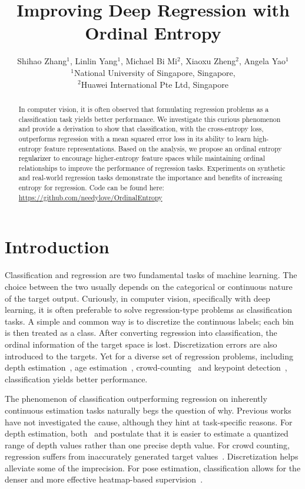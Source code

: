 \documentclass{article} %
\title{Improving Deep Regression with Ordinal Entropy}
\author{Shihao Zhang$^1$, Linlin Yang$^1$, Michael Bi Mi$^2$, Xiaoxu Zheng$^2$, Angela Yao$^1$ \\
$^1$National University of Singapore, Singapore, \\ 
$^2$Huawei International Pte Ltd, Singapore
}
\def\shihao{\textcolor{black}}
\begin{document}
\maketitle

\begin{abstract}
In computer vision, it is often observed that formulating regression problems as a classification task yields better performance.  
We investigate this curious phenomenon and provide a derivation to show that classification, with the cross-entropy loss, outperforms 
regression with a mean squared error loss in its ability to learn high-entropy feature representations.
Based on the analysis, we propose an ordinal entropy \shihao{regularizer} to encourage higher-entropy feature spaces while maintaining ordinal relationships to improve the performance of regression tasks.
Experiments on synthetic and real-world regression tasks demonstrate the 
importance and benefits of increasing entropy for regression. Code can be found here: \url{https://github.com/needylove/OrdinalEntropy}
\end{abstract}

\section{Introduction}
\label{sec:introduction}

Classification and regression are two fundamental tasks of machine learning. The choice between the two usually depends on the categorical or continuous nature of the target output. Curiously, in computer vision, specifically with deep learning, it is often preferable to solve regression-type problems as classification tasks. A simple and common way is to discretize the continuous labels; each bin is then treated as a class. After converting regression into classification, the ordinal information of the target space is lost. Discretization errors are also introduced to the targets. Yet for a diverse set of regression problems, including depth estimation~\citep{cao2017estimating}, age estimation~\citep{rothe2015dex}, crowd-counting~\citep{liu2019counting} and keypoint detection~\citep{li20212d}, classification yields better performance.


The phenomenon of classification outperforming regression on inherently continuous estimation tasks naturally begs the question of why. Previous works have not investigated the cause, although they hint at task-specific reasons. 
For depth estimation, both~\cite{cao2017estimating} and \cite{fu2018deep} postulate that it is easier to estimate a quantized range of depth values rather than one precise depth value. 
For crowd counting, regression suffers from inaccurately generated target values~\citep{xiong2022discrete}. Discretization helps alleviate some of the imprecision. For pose estimation, classification allows for the denser and more effective heatmap-based supervision~\citep{zhang2020distribution,gu2021removing,gu2021dive}. 
\end{document}
